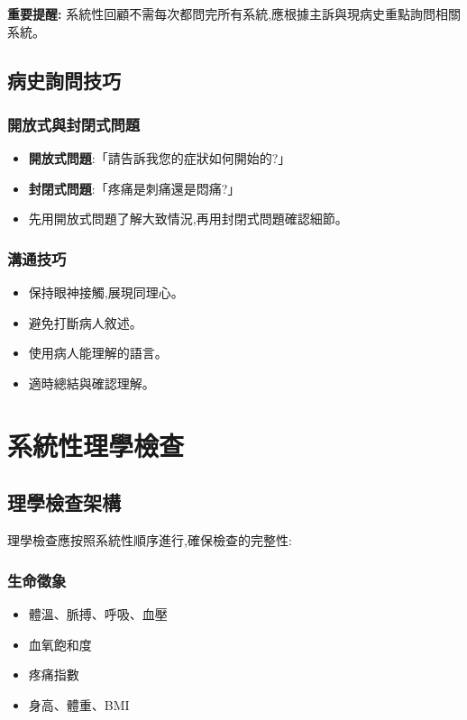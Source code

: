 \documentclass[12pt,a4paper]{article}
\begin{document}
\begin{importantbox}
\textbf{重要提醒:} 系統性回顧不需每次都問完所有系統,應根據主訴與現病史重點詢問相關系統。
\end{importantbox}

\subsection{病史詢問技巧}
\subsubsection{開放式與封閉式問題}
\begin{itemize}[nosep]
    \item \textbf{開放式問題}:「請告訴我您的症狀如何開始的?」
    \item \textbf{封閉式問題}:「疼痛是刺痛還是悶痛?」
    \item 先用開放式問題了解大致情況,再用封閉式問題確認細節。
\end{itemize}

\subsubsection{溝通技巧}
\begin{itemize}[nosep]
    \item 保持眼神接觸,展現同理心。
    \item 避免打斷病人敘述。
    \item 使用病人能理解的語言。
    \item 適時總結與確認理解。
\end{itemize}

\section{系統性理學檢查}

\subsection{理學檢查架構}
理學檢查應按照系統性順序進行,確保檢查的完整性:

\subsubsection{生命徵象}
\begin{itemize}[nosep]
    \item 體溫、脈搏、呼吸、血壓
    \item 血氧飽和度
    \item 疼痛指數
    \item 身高、體重、BMI
\end{itemize}
\end{document}
